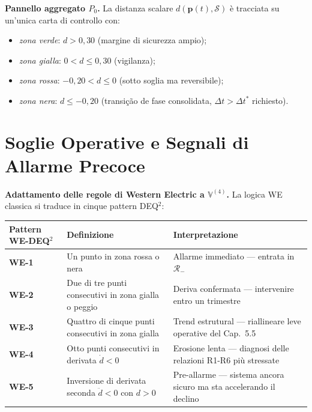 \Hypoth{} \textbf{Pannello aggregato \(P_0\).} La distanza scalare
\(d(\boldsymbol{p}(t), \mathcal{S})\) è tracciata su un'unica carta di
controllo con:

\begin{itemize}
\tightlist
\item
  \emph{zona verde}: \(d > 0{,}30\) (margine di sicurezza ampio);
\item
  \emph{zona gialla}: \(0 < d \leq 0{,}30\) (vigilanza);
\item
  \emph{zona rossa}: \(-0{,}20 < d \leq 0\) (sotto soglia ma
  reversibile);
\item
  \emph{zona nera}: \(d \leq -0{,}20\) (transição de fase consolidata,
  \(\Delta t > \Delta t^*\) richiesto).
\end{itemize}



\section{Soglie Operative e Segnali di Allarme
Precoce}\label{soglie-operative-e-segnali-di-allarme-precoce}

\Hypoth{} \textbf{Adattamento delle regole di Western Electric a
\(\mathbb{V}^{(4)}\).} La logica WE classica si traduce in cinque
pattern DEQ$^2$:

{\def\LTcaptype{none} %
{\small\begin{longtable}[]{@{}
  >{\raggedright\arraybackslash}p{}
  >{\raggedright\arraybackslash}p{}
  >{\raggedright\arraybackslash}p{}@{}}
\toprule\noalign{}
\begin{minipage}[b]{\linewidth}\raggedright
Pattern WE-DEQ$^2$
\end{minipage} & \begin{minipage}[b]{\linewidth}\raggedright
Definizione
\end{minipage} & \begin{minipage}[b]{\linewidth}\raggedright
Interpretazione
\end{minipage} \\
\midrule\noalign{}
\endhead
\bottomrule\noalign{}
\endlastfoot
\textbf{WE-1} & Un punto in zona rossa o nera & Allarme immediato ---
entrata in \(\mathcal{R}_-\) \\
\textbf{WE-2} & Due di tre punti consecutivi in zona gialla o peggio &
Deriva confermata --- intervenire entro un trimestre \\
\textbf{WE-3} & Quattro di cinque punti consecutivi in zona gialla &
Trend estrutural --- riallineare leve operative del Cap.~5.5 \\
\textbf{WE-4} & Otto punti consecutivi in derivata \(\dot d < 0\) &
Erosione lenta --- diagnosi delle relazioni R1-R6 più stressate \\
\textbf{WE-5} & Inversione di derivata seconda \(\ddot d < 0\) con
\(d > 0\) & Pre-allarme --- sistema ancora sicuro ma sta accelerando il
declino \\
\end{longtable}}
}

